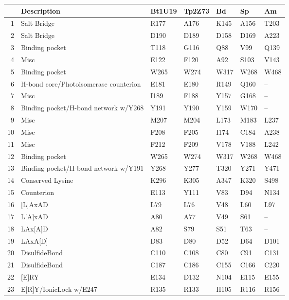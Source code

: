 \begin{table}[tbp]
\centering
\begin{tabular}{rllllll}
  \hline
\hline
 & Description & Bt1U19 & Tp2Z73 & Bd & Sp & Am \\ 
  \hline
1 & Salt Bridge & R177 & A176 & K145 & A156 & T203 \\ 
  2 & Salt Bridge & D190 & D189 & D158 & D169 & A223 \\ 
   \hline
3 & Binding pocket & T118 & G116 & Q88 & V99 & Q139 \\ 
  4 & Misc & E122 & F120 & A92 & S103 & V143 \\ 
  5 & Binding pocket & W265 & W274 & W317 & W268 & W468 \\ 
  6 & H-bond core/Photoisomerase counterion & E181 & E180 & R149 & Q160 & -- \\ 
  7 & Misc & I189 & F188 & Y157 & G168 & -- \\ 
  8 & Binding pocket/H-bond network w/Y268 & Y191 & Y190 & Y159 & W170 & -- \\ 
  9 & Misc & M207 & M204 & L173 & M183 & L237 \\ 
  10 & Misc & F208 & F205 & I174 & C184 & A238 \\ 
  11 & Misc & F212 & F209 & V178 & V188 & L242 \\ 
  12 & Binding pocket & W265 & W274 & W317 & W268 & W468 \\ 
  13 & Binding pocket/H-bond network w/Y191 & Y268 & Y277 & T320 & Y271 & Y471 \\ 
   \hline
14 & Conserved Lysine & K296 & K305 & A347 & K320 & S498 \\ 
  15 & Counterion & E113 & Y111 & V83 & D94 & N134 \\ 
   \hline
16 & [L]AxAD & L79 & L76 & V48 & L60 & L97 \\ 
  17 & L[A]xAD & A80 & A77 & V49 & S61 & -- \\ 
  18 & LAx[A]D & A82 & S79 & S51 & T63 & -- \\ 
  19 & LAxA[D] & D83 & D80 & D52 & D64 & D101 \\ 
   \hline
20 & DisulfideBond & C110 & C108 & C80 & C91 & C131 \\ 
  21 & DisulfideBond & C187 & C186 & C155 & C166 & C220 \\ 
   \hline
22 & [E]RY & E134 & D132 & N104 & E115 & E155 \\ 
  23 & E[R]Y/IonicLock w/E247 & R135 & R133 & H105 & R116 & R156 \\ 

\end{tabular}
\end{table}
